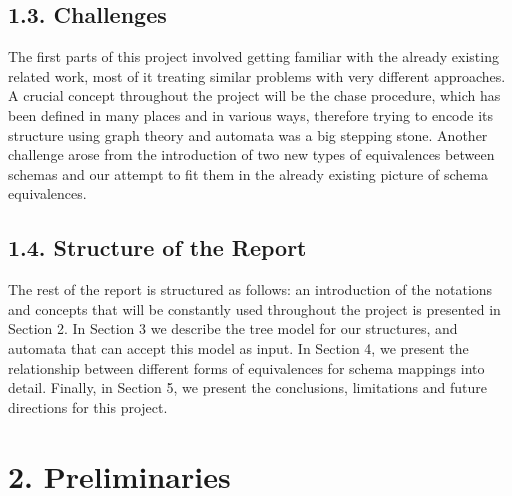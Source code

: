\documentclass[11pt, a4paper, dvipsnames]{article}
\begin{document}
\subsection{1.3. Challenges}
The first parts of this project involved getting familiar with the already existing related work, most of it treating similar problems with very different approaches. A crucial concept throughout the project will be the chase procedure, which has been defined in many places and in various ways, therefore trying to encode its structure using graph theory and automata was a big stepping stone. Another challenge arose from the introduction of two new types of equivalences between schemas and our attempt to fit them in the already existing picture of schema equivalences.

\subsection{1.4. Structure of the Report}
The rest of the report is structured as follows: an introduction of the notations and concepts that will be constantly used throughout the project is presented in Section 2. In Section 3 we describe the tree model for our structures, and automata that can accept this model as input. In Section 4, we present the relationship between different forms of equivalences for schema mappings into detail. Finally, in Section 5, we present the conclusions, limitations and future directions for this project. 

\newpage

\section{2. Preliminaries}
\end{document}
